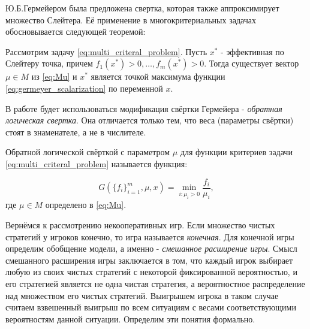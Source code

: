 Ю.Б.Гермейером была предложена свертка, которая также аппроксимирует 
множество Слейтера. Её применение в многокритериальных 
задачах обосновывается следующей теоремой:

\begin{Theorem}[Ю.Б. Гермейер]
	Рассмотрим задачу \eqref{eq:multi_criteral_problem}.     
    Пусть $x^*$ - эффективная по Слейтеру точка, 
    причем $f_1(x^*)>0, \ldots, f_m(x^*)>0$.
    Тогда существует вектор $\mu \in M$ из \eqref{eq:Mu} 
    и $x^*$ является точкой максимума функции 
    \eqref{eq:germeyer_scalarization} по переменной $x$. 
    \cite{germeyer} 
\end{Theorem}

В работе будет использоваться модификация свёртки Гермейера -
\textit{обратная логическая свертка}. Она отличается
только тем, что веса (параметры свёртки) стоят в знаменателе, 
а не в числителе.

\begin{Defenition}
	Обратной логической свёрткой с параметром $\mu$ для 
	функции критериев задачи \eqref{eq:multi_criteral_problem}
	называется функция:
	
	\begin{equation}
		G(\{f_i\}_{i=1}^{m}, \mu, x)=
		\min \limits_{i: \mu_i > 0} \frac{f_i}{\mu_i},
		\label{eq:RL_scalarization}	
	\end{equation}
	где $\mu \in M$ определено в \eqref{eq:Mu}.
\end{Defenition}

Вернёмся к рассмотрению некооперативных игр.
Если множество чистых стратегий у игроков конечно, то игра
называется \textit{конечная}. Для конечной игры
определим обобщение модели, 
а именно - \textit{смешанное расширение игры}.
Смысл смешанного расширения игры заключается в том, что
каждый игрок выбирает любую из своих чистых стратегий с некоторой
фиксированной вероятностью, и его стратегией является
не одна чистая стратегия, а вероятностное  распределение над множеством 
его чистых стратегий. Выигрышем игрока в таком случае считаем взвешенный
выигрыш по всем ситуациям с весами соответствующими вероятностям данной
ситуации. Определим эти понятия формально.

